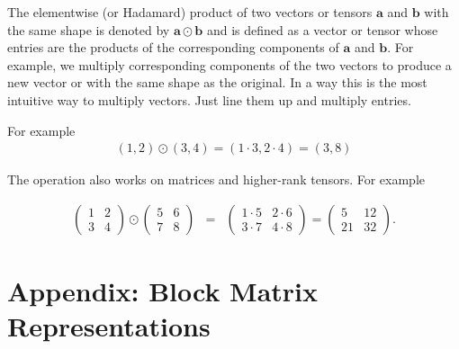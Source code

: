 The elementwise (or Hadamard) product of two vectors or tensors $\mathbf{a}$ and $\mathbf{b}$ with the same shape is denoted by $\mathbf{a} \odot \mathbf{b}$ and is defined as a vector or tensor whose entries are the products of the corresponding components of $\mathbf{a}$  and $\mathbf{b}$. For example, we multiply corresponding components of the two vectors to produce a new vector or with the same shape as the original. In a way this is the most intuitive way to multiply vectors. Just line them up and multiply entries.

For example
\begin{eqnarray}
(1,2) \odot (3,4) = (1 \cdot 3,  2 \cdot 4) =  (3,8)
\end{eqnarray}

The operation also works on matrices and higher-rank tensors. For example

\begin{eqnarray}
\begin{pmatrix} 1 & 2 \\ 3 & 4 \end{pmatrix} \odot \begin{pmatrix} 5 & 6 \\ 7 & 8 \end{pmatrix} &=& \begin{pmatrix} 1 \cdot 5 & 2 \cdot 6 \\ 3 \cdot 7 & 4 \cdot 8 \end{pmatrix} = \begin{pmatrix} 5 & 12 \\ 21 & 32 \end{pmatrix}.
\end{eqnarray}


\section{Appendix: Block Matrix Representations}

